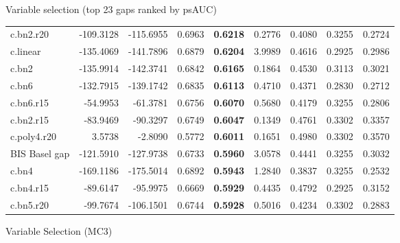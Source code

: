 \documentclass[
  ignorenonframetext,
]{beamer}
\begin{document}
\begin{frame}{Variable selection (top 23 gaps ranked by psAUC)}
{\begin{tabular}[t]{lrrr>{}rrrrr}
\addlinespace
c.bn2.r20 & -109.3128 & -115.6955 & 0.6963 & \textbf{0.6218} & 0.2776 & 0.4080 & 0.3255 & 0.2724\\
c.linear & -135.4069 & -141.7896 & 0.6879 & \textbf{0.6204} & 3.9989 & 0.4616 & 0.2925 & 0.2986\\
c.bn2 & -135.9914 & -142.3741 & 0.6842 & \textbf{0.6165} & 0.1864 & 0.4530 & 0.3113 & 0.3021\\
c.bn6 & -132.7915 & -139.1742 & 0.6835 & \textbf{0.6113} & 0.4710 & 0.4371 & 0.2830 & 0.2712\\
c.bn6.r15 & -54.9953 & -61.3781 & 0.6756 & \textbf{0.6070} & 0.5680 & 0.4179 & 0.3255 & 0.2806\\
\addlinespace
c.bn2.r15 & -83.9469 & -90.3297 & 0.6749 & \textbf{0.6047} & 0.1349 & 0.4761 & 0.3302 & 0.3357\\
c.poly4.r20 & 3.5738 & -2.8090 & 0.5772 & \textbf{0.6011} & 0.1651 & 0.4980 & 0.3302 & 0.3570\\
BIS Basel gap & -121.5910 & -127.9738 & 0.6733 & \textbf{0.5960} & 3.0578 & 0.4441 & 0.3255 & 0.3032\\
c.bn4 & -169.1186 & -175.5014 & 0.6892 & \textbf{0.5943} & 1.2840 & 0.3837 & 0.3255 & 0.2532\\
c.bn4.r15 & -89.6147 & -95.9975 & 0.6669 & \textbf{0.5929} & 0.4435 & 0.4792 & 0.2925 & 0.3152\\
\addlinespace
c.bn5.r20 & -99.7674 & -106.1501 & 0.6744 & \textbf{0.5928} & 0.5016 & 0.4234 & 0.3302 & 0.2883\\
\bottomrule
\end{tabular}}
\end{frame}

\begin{frame}{Variable Selection (MC3)}
\protect\hypertarget{variable-selection-mc3}{}
\end{frame}
\end{document}
